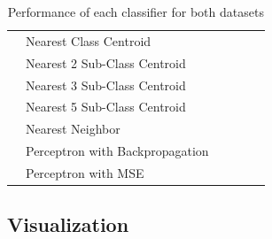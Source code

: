 \begin{table}[htbp]
\begin{tabular}{|l|l|l|l|l|l|}
    \hline
            & Nearest Class Centroid          &                      &                      &                      &            \\ 
    \cline{2-6}
            & Nearest 2 Sub-Class Centroid    &                      &                      &                      &            \\ 
    \cline{2-6}
            & Nearest 3 Sub-Class Centroid    &                      &                      &                      &            \\ 
    \cline{2-6}
            & Nearest 5 Sub-Class Centroid    &                      &                      &                      &            \\ 
    \cline{2-6}
            & Nearest Neighbor                &                      &                      &                      &            \\ 
    \cline{2-6}
            & Perceptron with Backpropagation &                      &                      &                      &            \\ 
    \cline{2-6}
            & Perceptron with MSE             &                      &                      &                      &            \\
    \hline
    \end{tabular}
    \caption{Performance of each classifier for both datasets}
    \label{tab:classifiers-performance}
\end{table}

\subsection{Visualization}
